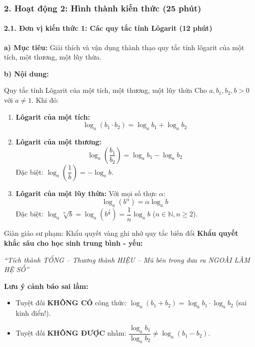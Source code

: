 \documentclass[12pt, a4paper]{article}
\begin{document}
\subsubsection*{2. Hoạt động 2: Hình thành kiến thức (25 phút)}

\paragraph{2.1. Đơn vị kiến thức 1: Các quy tắc tính Lôgarit (12 phút)}

\noindent \textbf{a) Mục tiêu:}
Giải thích và vận dụng thành thạo quy tắc tính lôgarit của một tích, một thương, một lũy thừa.

\noindent \textbf{b) Nội dung:}
\begin{pedabox}{Quy tắc tính Lôgarit của một tích, một thương, một lũy thừa}
Cho $a, b_1, b_2, b > 0$ với $a \neq 1$. Khi đó:
\begin{enumerate}[leftmargin=0.6cm]
    \item \textbf{Lôgarit của một tích:}
    $$\log_a (b_1 \cdot b_2) = \log_a b_1 + \log_a b_2$$
    \item \textbf{Lôgarit của một thương:}
    $$\log_a \left(\dfrac{b_1}{b_2}\right) = \log_a b_1 - \log_a b_2$$
    Đặc biệt: $\log_a \left(\dfrac{1}{b}\right) = -\log_a b$.
    \item \textbf{Lôgarit của một lũy thừa:} Với mọi số thực $\alpha$:
    $$\log_a (b^\alpha) = \alpha \log_a b$$
    Đặc biệt: $\log_a \sqrt[n]{b} = \log_a \left(b^{\frac{1}{n}}\right) = \dfrac{1}{n} \log_a b$ ($n \in \mathbb{N}, n \ge 2$).
\end{enumerate}
\end{pedabox}

\begin{scaffoldbox}{Giàn giáo sư phạm: Khẩu quyết vàng ghi nhớ quy tắc biến đổi}
\textbf{Khẩu quyết khắc sâu cho học sinh trung bình - yếu:}
\begin{center}
\textit{``Tích thành TỔNG -- Thương thành HIỆU -- Mũ bên trong đưa ra NGOÀI LÀM HỆ SỐ''}
\end{center}
\textbf{Lưu ý cảnh báo sai lầm:}
\begin{itemize}
    \item Tuyệt đối \textbf{KHÔNG CÓ} công thức: $\log_a (b_1 + b_2) = \log_a b_1 \cdot \log_a b_2$ (sai kinh điển!).
    \item Tuyệt đối \textbf{KHÔNG ĐƯỢC} nhầm: $\dfrac{\log_a b_1}{\log_a b_2} \neq \log_a (b_1 - b_2)$.
\end{itemize}
\end{scaffoldbox}
\end{document}
